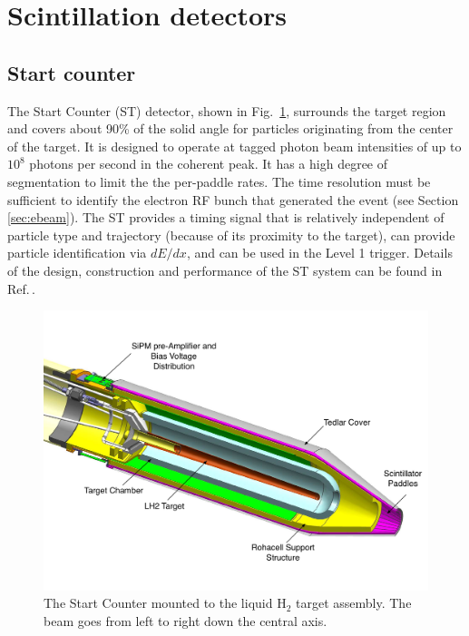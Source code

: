 \section[Scintillation detectors]{Scintillation detectors \label{sec:scintillators}}
\subsection{Start counter \label{sec:st}}

The Start Counter (ST) detector, shown in Fig.~\ref{fig:st-overview-drawing},
surrounds the target
region and covers about 90\% of the solid angle for particles
originating from the center of the target. It is designed to operate
at tagged photon beam intensities of up to $10^8$ photons per second
in the coherent peak. It has a high degree of segmentation to limit
the the per-paddle rates. The time resolution must be sufficient to identify the electron RF bunch that generated the event
(see Section\,\ref{sec:ebeam}). The ST provides a timing signal that is relatively independent of particle type and trajectory (because of its proximity to the target), can provide particle identification via $dE/dx$, and can be used in the Level 1 trigger. Details of the design, construction and performance of the ST system can be found in 
Ref.\,\cite{Pooser:2019rhu}.

\begin{figure}[!htb]
\centering
\includegraphics[width=1.0\columnwidth]{figures/start_counter_all.pdf}
\caption{The \gx{} Start Counter mounted to the liquid $\mathrm{H_2}$
  target assembly.  The beam goes from left to right down the central
  axis.\label{fig:st-overview-drawing}}
\end{figure}

